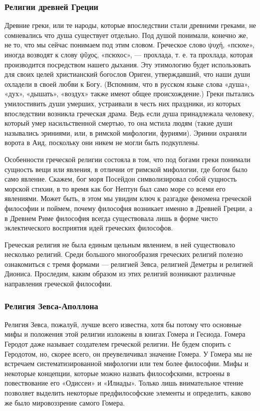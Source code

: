     \subsubsection{Религии древней Греции}	
    Древние греки, или те народы, которые впоследствии стали древними греками, не сомневались
	что душа существует отдельно. Под душой понимали, конечно же, не то, что мы сейчас 
	понимаем под этим словом. Греческое слово ψυχή, «псюхе», иногда возводят к слову 
	ψῦχος, «псюхос», — прохлада, т. е. та прохлада, которая производится посредством нашего 
	дыхания. Эту этимологию будет использовать для своих целей христианский богослов Ориген, 
	утверждавший, что наши души охладели в своей любви к Богу. (Вспомним, что в русском 
	языке слова «душа», «дух», «дышать», «воздух» также имеют общее происхождение.) Греки 
	пытались умилостивить души умерших, устраивали в честь них праздники, из которых 
	впоследствии возникла греческая драма. Ведь если душа принадлежала человеку, который 
	умер насильственной смертью, то она мстила людям (такие души назывались эриниями, или, 
	в римской мифологии, фуриями). Эринии охраняли ворота в Аид, поскольку они никем не 
	могли быть подкуплены. 
    
    \par Особенности греческой религии состояла в том, что под богами греки понимали сущность 
	вещи или явления, в отличии от римской мифологии, где богом было само явление. Скажем, 
	бог моря Посейдон символизировал собой сущность морской стихии, в то время как бог Нептун 
	был само море со всеми его явлениями. Может быть, в этом мы увидим ключ к разгадке 
	феномена греческой философии и поймем, почему философия возникает именно в Древней 
	Греции, а в Древнем Риме философия всегда существовала лишь в форме чисто эклектического 
	восприятия идей греческих философов.
    
    \par Греческая религия не была единым цельным явлением, в ней существовало несколько 
	религий. Среди большого многообразия греческих религий полезно ознакомиться с тремя 
	формами — религией Зевса, религией Деметры и религией Диониса. Проследим, каким образом 
	из этих религий возникают различные направления греческой философии.
    
    \subsubsection{Религия Зевса-Аполлона}
    
    \par Религия Зевса, пожалуй, лучше всего известна, хотя бы потому что основные мифы 
	и положения этой религии изложены в книгах Гомера и Гесиода. Гомера Геродот даже 
	называет создателем греческой религии. Не будем спорить с Геродотом, но, скорее всего, 
	он преувеличивал значение Гомера. У Гомера мы не встречаем систематизированной мифологии 
	или тем более философии. Мифы и некоторые концепции, которые можно назвать философскими, 
	встроены в повествование его «Одиссеи» и «Илиады». Только лишь внимательное чтение 
	позволяет выделить некоторые предфилософские элементы и определить, каково же было 
	мировоззрение самого Гомера.
    
